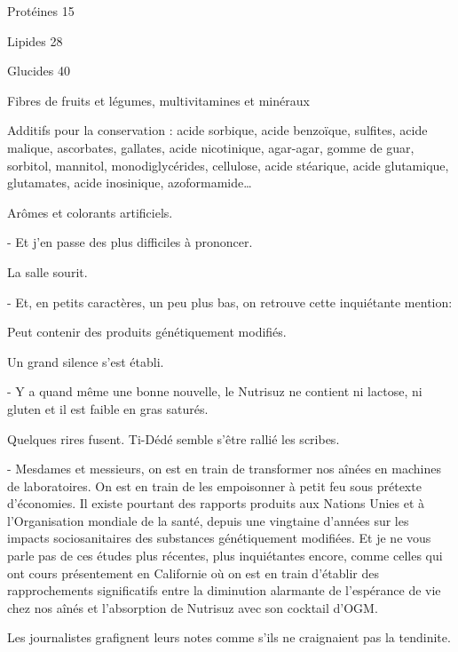     Protéines 15%

    Lipides 28%

    Glucides 40%

    Fibres de fruits et légumes, multivitamines et minéraux

    Additifs pour la conservation : acide sorbique, acide benzoïque, sulfites, acide malique, ascorbates, gallates, acide nicotinique, agar-agar, gomme de guar, sorbitol, mannitol, monodiglycérides, cellulose, acide stéarique, acide glutamique, glutamates, acide inosinique, azoformamide…

    Arômes et colorants artificiels.

- Et j’en passe des plus difficiles à prononcer.

La salle sourit.

- Et, en petits caractères, un peu plus bas, on retrouve cette inquiétante mention:

    Peut contenir des produits génétiquement modifiés.

Un grand silence s’est établi.

- Y a quand même une bonne nouvelle, le Nutrisuz ne contient ni lactose, ni gluten et il est faible en gras saturés.

Quelques rires fusent. Ti-Dédé semble s’être rallié les scribes.

- Mesdames et messieurs, on est en train de transformer nos aînées en machines de laboratoires. On est en train de les empoisonner à petit feu sous prétexte d’économies. Il existe pourtant des rapports produits aux Nations Unies et à l’Organisation mondiale de la santé, depuis une vingtaine d’années sur les impacts sociosanitaires des substances génétiquement modifiées. Et je ne vous parle pas de ces études plus récentes, plus inquiétantes encore, comme celles qui ont cours présentement en Californie où on est en train d’établir des rapprochements significatifs entre la diminution alarmante de l’espérance de vie chez nos aînés et l’absorption de Nutrisuz avec son cocktail d’OGM.

Les journalistes grafignent leurs notes comme s’ils ne craignaient pas la tendinite.

